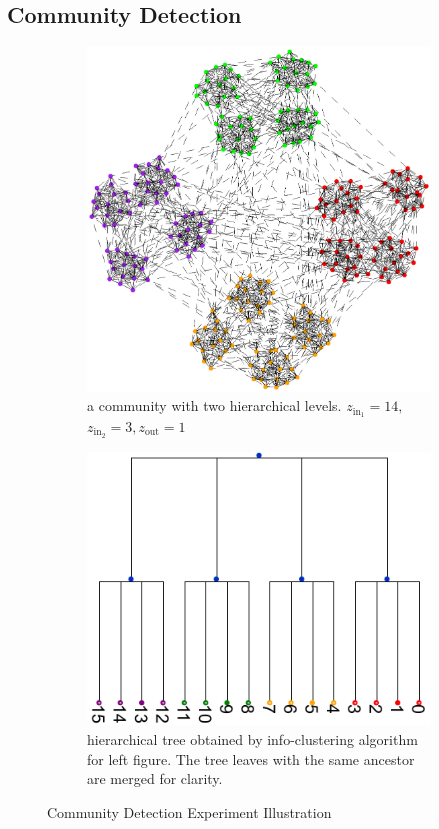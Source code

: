 \documentclass{article}
\begin{document}
\subsection{Community Detection}
\begin{figure}
	\centering
	\begin{subfigure}{0.45\textwidth}
		\includegraphics[width=\textwidth]{pic/two_level.eps}
		\caption{a community with two hierarchical levels. $z_{\mathrm{in}_1} = 14,$ $z_{\mathrm{in}_2} = 3, z_{\mathrm{out}}=1$}\label{fig:c1}
	\end{subfigure}
	\begin{subfigure}{0.45\textwidth}
		\includegraphics[width=\textwidth]{pic/tree_info-clustering.pdf}
		\caption{hierarchical tree obtained by info-clustering algorithm for left figure. The tree leaves with the same ancestor are merged for clarity.}\label{fig:c2}
	\end{subfigure}
	\caption{Community Detection Experiment Illustration}
\end{figure}
\end{document}

